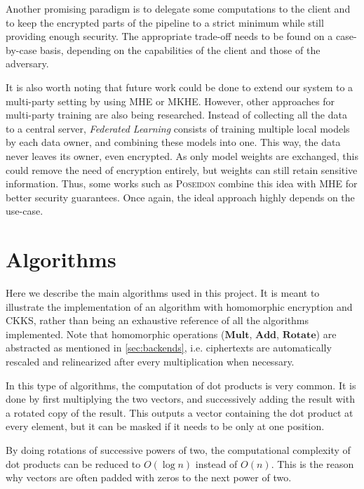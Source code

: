 \documentclass[a4paper,11pt,oneside]{report}
\begin{document}
Another promising paradigm is to delegate some computations to the client and to keep the encrypted parts of the pipeline to a strict minimum while still providing enough security. 
The appropriate trade-off needs to be found on a case-by-case basis, depending on the capabilities of the client and those of the adversary.

It is also worth noting that future work could be done to extend our system to a multi-party setting by using MHE or MKHE. 
However, other approaches for multi-party training are also being researched. 
Instead of collecting all the data to a central server, \emph{Federated Learning} consists of training multiple local models by each data owner, and combining these models into one.
This way, the data never leaves its owner, even encrypted.
As only model weights are exchanged, this could remove the need of encryption entirely, but weights can still retain sensitive information.
Thus, some works such as \textsc{Poseidon} \cite{sav_poseidon_2021} combine this idea with MHE for better security guarantees.
Once again, the ideal approach highly depends on the use-case. 


\cleardoublepage
{}
{}
\printbibliography

\appendix
\chapter{Algorithms}

Here we describe the main algorithms used in this project. 
It is meant to illustrate the implementation of an algorithm with homomorphic encryption and CKKS, rather than being an exhaustive reference of all the algorithms implemented. 
Note that homomorphic operations ($\mathbf{Mult}$, $\mathbf{Add}$, $\mathbf{Rotate}$) are abstracted as mentioned in \autoref{sec:backends}, i.e. ciphertexts are automatically rescaled and relinearized after every multiplication when necessary.

In this type of algorithms, the computation of dot products is very common. 
It is done by first multiplying the two vectors, and successively adding the result with a rotated copy of the result. 
This outputs a vector containing the dot product at every element, but it can be masked if it needs to be only at one position.

By doing rotations of successive powers of two, the computational complexity of dot products can be reduced to $O(\log n)$ instead of $O(n)$. 
This is the reason why vectors are often padded with zeros to the next power of two.
\end{document}

